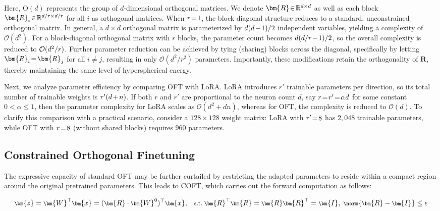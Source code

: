 Here, $\text{O}(d)$ represents the group of $d$-dimensional orthogonal matrices. We denote $\thickmuskip=2mu \medmuskip=2mu \bm{R}\in\mathbb{R}^{d\times d}$ as well as each block $\thickmuskip=2mu \medmuskip=2mu \bm{R}_i\in\mathbb{R}^{d/r\times d/r}$ for all $i$ as orthogonal matrices. When $\thickmuskip=2mu \medmuskip=2mu r=1$, the block-diagonal structure reduces to a standard, unconstrained orthogonal matrix. In general, a $d\times d$ orthogonal matrix is parameterized by $\thickmuskip=2mu \medmuskip=2mu d(d-1)/2$ independent variables, yielding a complexity of $\mathcal{O}(d^2)$. For a block-diagonal orthogonal matrix with $r$ blocks, the parameter count becomes $\thickmuskip=2mu \medmuskip=2mu d(d/r-1)/2$, so the overall complexity is reduced to $\thickmuskip=2mu \medmuskip=2mu \mathcal{O}(d^2/r)$. Further parameter reduction can be achieved by tying (sharing) blocks across the diagonal, specifically by letting $\thickmuskip=2mu \medmuskip=2mu\bm{R}_i=\bm{R}_j$ for all $i\neq j$, resulting in only $\mathcal{O}(d^2/r^2)$ parameters. Importantly, these modifications retain the orthogonality of $\bm{R}$, thereby maintaining the same level of hyperspherical energy.

Next, we analyze parameter efficiency by comparing OFT with LoRA. LoRA introduces $r'$ trainable parameters per direction, so its total number of trainable weights is $\thickmuskip=2mu \medmuskip=2mu r'(d+n)$. If both $r$ and $r'$ are proportional to the neuron count $d$, say $\thickmuskip=2mu \medmuskip=2mu r=r'=\alpha d$ for some constant $0<\alpha\leq 1$, then the parameter complexity for LoRA scales as $\mathcal{O}(d^2+dn)$, whereas for OFT, the complexity is reduced to $\mathcal{O}(d)$. To clarify this comparison with a practical scenario, consider a $128\times 128$ weight matrix: LoRA with $\thickmuskip=2mu \medmuskip=2mu r'=8$ has $2{,}048$ trainable parameters, while OFT with $\thickmuskip=2mu \medmuskip=2mu r=8$ (without shared blocks) requires $960$ parameters.

\subsection{Constrained Orthogonal Finetuning}

The expressive capacity of standard OFT may be further curtailed by restricting the adapted parameters to reside within a compact region around the original pretrained parameters. This leads to COFT, which carries out the forward computation as follows:

\begin{equation}\label{eq:coft_general}
    \footnotesize
    \bm{z}=\bm{W}^\top\bm{x}=(\bm{R}\cdot\bm{W}^0)^\top\bm{x},~~~\text{s.t.}~\bm{R}^\top\bm{R}=\bm{R}\bm{R}^\top=\bm{I},~\norm{\bm{R}-\bm{I}}\leq \epsilon
\end{equation}

